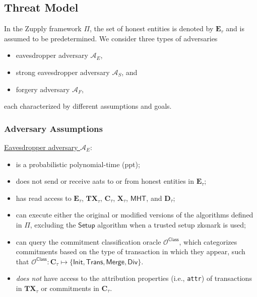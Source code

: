 \subsection{Threat Model}\label{sec:threat_model}

In the Zupply framework $\Pi$, the set of honest entities is denoted by $\mathbf{E}_\tau$ and is assumed to be predetermined. We consider three types of adversaries
\begin{itemize}
	\item eavesdropper adversary $\mathcal{A}_E$,
	\item strong eavesdropper adversary $\mathcal{A}_S$, and
	\item forgery adversary $\mathcal{A}_F$, 
\end{itemize}
each characterized by different assumptions and goals. 

\subsubsection{Adversary Assumptions}\label{sec:adv_assumption}


\underline{Eavesdropper adversary  $\mathcal{A}_E$}:
\begin{itemize}
	\item is a probabilistic polynomial-time (\gls{ppt});
	 \item does not send or receive \glspl{aat} to or from honest entities in  $\mathbf{E}_\tau$;
	\item has read access to $\mathbf{E}_\tau$, $\mathbf{TX}_\tau$, $\mathbf{C}_\tau$, $\mathbf{X}_\tau$, $\mathsf{MHT}$, and $\mathbf{D}_\tau$;
	\item can execute either the original or modified versions of the algorithms defined in $\Pi$, excluding the $\mathsf{Setup}$ algorithm when a trusted setup \gls{zksnark} is used;
	\item can query the commitment classification oracle $\mathcal{O}^\mathsf{Class}$, which categorizes commitments based on the type of transaction in which they appear, such that	$\mathcal{O}^\mathsf{Class}: \mathbf{C}_\tau \mapsto \{\textsf{Init}, \textsf{Trans}, \textsf{Merge}, \textsf{Div}\}$.
	\item \textit{does not} have access to the attribution properties (i.e., \texttt{attr})  of transactions in $\mathbf{TX}_\tau$ or commitments in $\mathbf{C}_\tau$.
\end{itemize}




